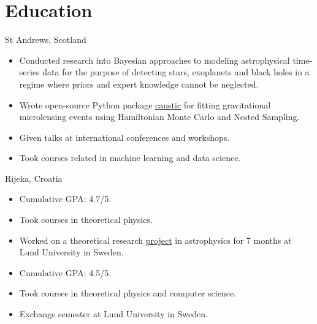 \documentclass[11pt,a4paper,roman, colorlinks,linkcolor=true]{moderncv}
\begin{document}
\section{Education}
{St Andrews, Scotland}{}{    \begin{itemize}
            \item Conducted research into Bayesian approaches to modeling astrophysical time-series data for the purpose of detecting stars, exoplanets and black holes in a regime where priors and expert knowledge cannot be neglected.
            \item Wrote open-source Python package \href{https://caustic.readthedocs.io/en/latest/}{caustic} for fitting gravitational microlensing events using Hamiltonian Monte Carlo and Nested Sampling.
       \item Given talks at international conferences and workshops.
           \item Took courses related in machine learning and data science.
\end{itemize}}
{Rijeka, Croatia}{}{\begin{itemize}\item Cumulative GPA: 4.7/5. 
            \item Took courses in theoretical physics.
\item Worked on a theoretical research \href{https://github.com/fbartolic/master_thesis}{project} in astrophysics for 7 months at Lund University in Sweden.\end{itemize}}
{\begin{itemize}\item Cumulative GPA: 4.5/5.
            \item Took courses in theoretical physics and computer science.
            \item Exchange semester at Lund University in Sweden.
\end{itemize}}
\end{document}
